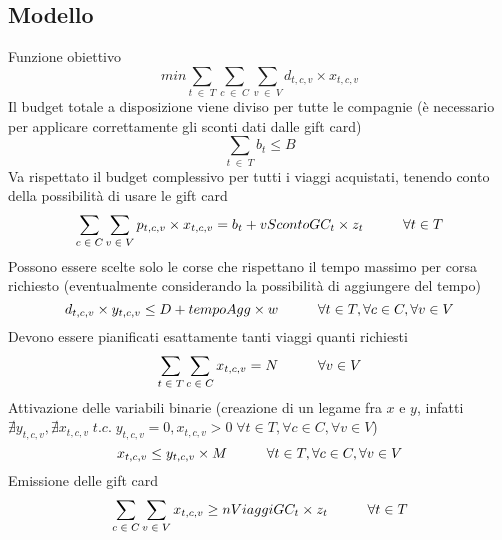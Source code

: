 \documentclass[main.tex]{subfiles}
\begin{document}
\subsection*{Modello}
Funzione obiettivo
$$min \sum_{t\; \in\; T} \sum_{c\; \in\; C} \sum_{v\; \in\; V} d_{t,c,v} \times{} x_{t,c,v}$$
Il budget totale a disposizione viene diviso per tutte le compagnie (è necessario per applicare correttamente gli sconti dati dalle gift card)
$$\sum_{t\; \in\; T} b_t \leq B$$
Va rispettato il budget complessivo per tutti i viaggi acquistati, tenendo conto della possibilità di usare le gift card
$$\sum_{c\; \in\; C} \sum_{v\; \in\; V} p_{t,c,v} \times{} x_{t,c,v} = b_t + vScontoGC_t \times{} z_t \hspace{10mm} \forall{} t \in T$$
Possono essere scelte solo le corse che rispettano il tempo massimo per corsa richiesto (eventualmente considerando la possibilità di aggiungere del tempo)
$$d_{t,c,v} \times{} y_{t,c,v} \leq D + tempoAgg \times w \hspace{10mm} \forall{} t \in T, \forall{} c \in C, \forall{} v \in V$$
Devono essere pianificati esattamente tanti viaggi quanti richiesti
$$\sum_{t\; \in\; T} \sum_{c\; \in\; C} x_{t,c,v} = N \hspace{10mm} \forall{} v \in V$$
Attivazione delle variabili binarie (creazione di un legame fra $x$ e $y$, infatti $\nexists y_{t,c,v}, \nexists x_{t,c,v}\; t.c.\; y_{t,c,v} = 0, x_{t,c,v} > 0\; \forall{} t \in T, \forall{} c \in C, \forall{} v \in V$)
$$x_{t,c,v} \leq y_{t,c,v} \times{} M \hspace{10mm} \forall{} t \in T, \forall{} c \in C, \forall{} v \in V$$
Emissione delle gift card
$$\sum_{c\; \in\; C} \sum_{v\; \in\; V} x_{t,c,v} \geq nViaggiGC_t \times z_t \hspace{10mm} \forall{} t \in T$$
\end{document}
